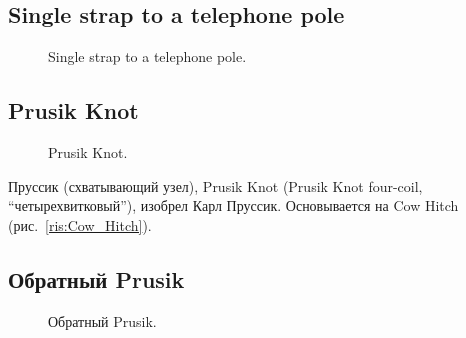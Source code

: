 \subsection{Single strap to a telephone pole}

\begin{figure}[H]\centering
	\begin{minipage}{1\linewidth}
		\begin{center}
			\tcbox[enhanced jigsaw,colframe=black,opacityframe=0.5,opacityback=0.5]
			{\centering{}}
		\end{center}
	\end{minipage}
\caption{Single strap to a telephone pole.}
\label{ris:Single_strap_to_a_telephone_pole}
\end{figure}

\subsection{Prusik Knot}

\begin{figure}[H]\centering
	\begin{minipage}{1\linewidth}
		\begin{center}
			\tcbox[enhanced jigsaw,colframe=black,opacityframe=0.5,opacityback=0.5]
			{\centering{}}
		\end{center}
	\end{minipage}
\caption{Prusik Knot.}
\label{ris:Prusik_Knot}
\end{figure}

Пруссик (схватывающий узел), Prusik Knot (Prusik Knot four-coil, “четырехвитковый”), изобрел Карл Пруссик. Основывается на Cow Hitch (рис.~\ref{ris:Cow_Hitch}).

\subsection{Обратный Prusik}

\begin{figure}[H]\centering
	\begin{minipage}{1\linewidth}
		\begin{center}
			\tcbox[enhanced jigsaw,colframe=black,opacityframe=0.5,opacityback=0.5]
			{\centering{}}
		\end{center}
	\end{minipage}
\caption{Обратный Prusik.}
\label{ris:Prusik_Revers}
\end{figure}

